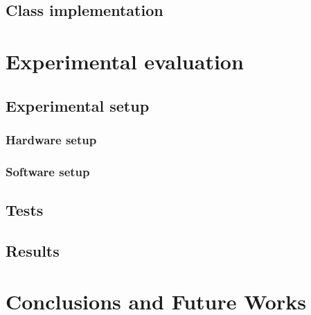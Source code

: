 \subsection{Class implementation}


\section{Experimental evaluation}


\subsection{Experimental setup}
\subsubsection{Hardware setup}
\subsubsection{Software setup}
\subsection{Tests}
\subsection{Results}

\section{Conclusions and Future Works}

